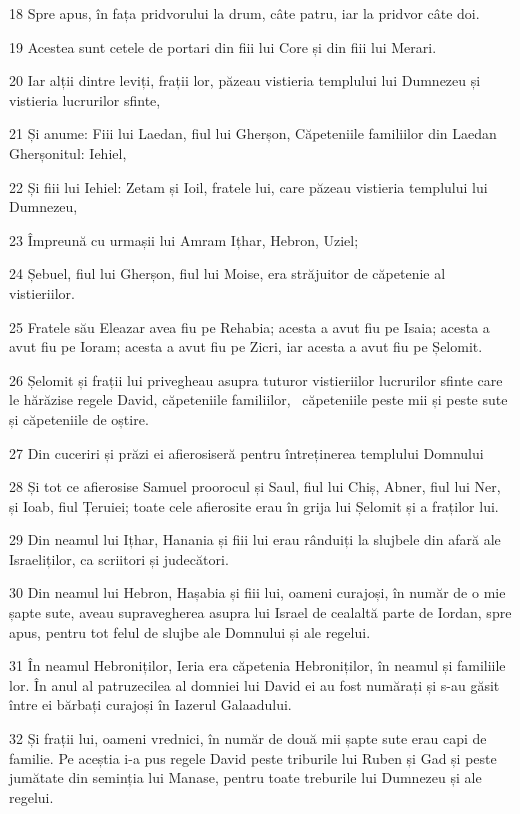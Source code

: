 \par 18 Spre apus, în fața pridvorului la drum, câte patru, iar la pridvor câte doi.
\par 19 Acestea sunt cetele de portari din fiii lui Core și din fiii lui Merari.
\par 20 Iar alții dintre leviți, frații lor, păzeau vistieria templului lui Dumnezeu și vistieria lucrurilor sfinte,
\par 21 Și anume: Fiii lui Laedan, fiul lui Gherșon, Căpeteniile familiilor din Laedan Gherșonitul: Iehiel,
\par 22 Și fiii lui Iehiel: Zetam și Ioil, fratele lui, care păzeau vistieria templului lui Dumnezeu,
\par 23 Împreună cu urmașii lui Amram Ițhar, Hebron, Uziel;
\par 24 Șebuel, fiul lui Gherșon, fiul lui Moise, era străjuitor de căpetenie al vistieriilor.
\par 25 Fratele său Eleazar avea fiu pe Rehabia; acesta a avut fiu pe Isaia; acesta a avut fiu pe Ioram; acesta a avut fiu pe Zicri, iar acesta a avut fiu pe Șelomit.
\par 26 Șelomit și frații lui privegheau asupra tuturor vistieriilor lucrurilor sfinte care le hărăzise regele David, căpeteniile familiilor,  căpeteniile peste mii și peste sute și căpeteniile de oștire.
\par 27 Din cuceriri și prăzi ei afierosiseră pentru întreținerea templului Domnului
\par 28 Și tot ce afierosise Samuel proorocul și Saul, fiul lui Chiș, Abner, fiul lui Ner, și Ioab, fiul Țeruiei; toate cele afierosite erau în grija lui Șelomit și a fraților lui.
\par 29 Din neamul lui Ițhar, Hanania și fiii lui erau rânduiți la slujbele din afară ale Israeliților, ca scriitori și judecători.
\par 30 Din neamul lui Hebron, Hașabia și fiii lui, oameni curajoși, în număr de o mie șapte sute, aveau supravegherea asupra lui Israel de cealaltă parte de Iordan, spre apus, pentru tot felul de slujbe ale Domnului și ale regelui.
\par 31 În neamul Hebroniților, Ieria era căpetenia Hebroniților, în neamul și familiile lor. În anul al patruzecilea al domniei lui David ei au fost numărați și s-au găsit între ei bărbați curajoși în Iazerul Galaadului.
\par 32 Și frații lui, oameni vrednici, în număr de două mii șapte sute erau capi de familie. Pe aceștia i-a pus regele David peste triburile lui Ruben și Gad și peste jumătate din seminția lui Manase, pentru toate treburile lui Dumnezeu și ale regelui.

